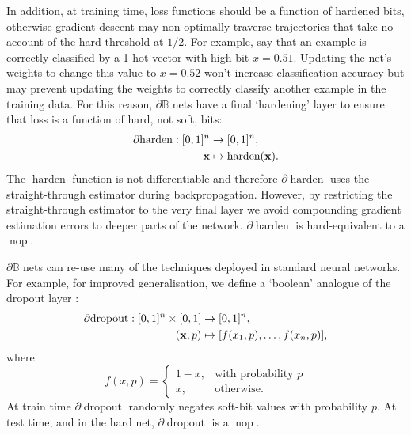 \documentclass{article} %
\begin{document}
In addition, at training time, loss functions should be a function of hardened bits, otherwise gradient descent may non-optimally traverse trajectories that take no account of the hard threshold at $1/2$. For example, say that an example is correctly classified by a 1-hot vector with high bit $x=0.51$. Updating the net's weights to change this value to $x=0.52$ won't increase classification accuracy but may prevent updating the weights to correctly classify another example in the training data. For this reason, $\partial\mathbb{B}$ nets have a final `hardening' layer to ensure that loss is a function of hard, not soft, bits:
\begin{equation*}
\begin{aligned}
\partial\!\operatorname{harden}: [0,1]^{n} &\to [0,1]^{n}, \\
{\bf x} &\mapsto \operatorname{harden}({\bf x})\text{.}
\end{aligned}
\end{equation*}
The $\operatorname{harden}$ function is not differentiable and therefore $\partial\!\operatorname{harden}$ uses the straight-through estimator \citep{DBLP:journals/corr/BengioLC13} during backpropagation. However, by restricting the straight-through estimator to the very final layer we avoid compounding gradient estimation errors to deeper parts of the network. $\partial\!\operatorname{harden}$ is hard-equivalent to a $\operatorname{nop}$.

$\partial\mathbb{B}$ nets can re-use many of the techniques deployed in standard neural networks. For example, for improved generalisation, we define a `boolean' analogue of the dropout layer \citep{JMLR:v15:srivastava14a}:
\begin{equation*}
\begin{aligned}
\partial\!\operatorname{dropout}: [0,1]^{n} \times [0,1] &\to [0,1]^{n}, \\
({\bf x}, p) &\mapsto [f(x_{1}, p), \dots, f(x_{n}, p)]\text{,}
\end{aligned}
\end{equation*}
where
\begin{equation*}
f(x, p) = \begin{cases}
1 - x, & \text{with probability } p \\
x, & \text{otherwise.}
\end{cases}
\end{equation*}
At train time $\partial\!\operatorname{dropout}$ randomly negates soft-bit values with probability $p$. At test time, and in the hard net, $\partial\!\operatorname{dropout}$ is a $\operatorname{nop}$.
\end{document}
